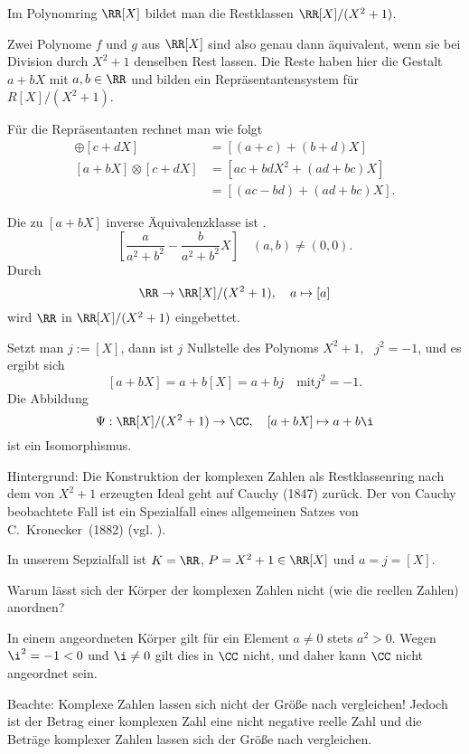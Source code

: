 \begin{antwort}
Im Polynomring $\RR[X]$ bildet man die Restklassen $\RR[X]/(X^2 +1)$.

Zwei Polynome $f$ und $g$ aus $\RR[X]$ sind also genau dann äquivalent, 
wenn sie bei Division durch $X^2+1$ denselben Rest lassen. 
Die Reste haben hier die Gestalt $a+bX$ mit $a,b\in\RR$ und bilden 
ein Repräsentantensystem für $R[X]/(X^2+1)$. 

Für die Repräsentanten rechnet man wie folgt
\begin{align*}
[a+bX] \oplus [c+dX] &= \left[(a+c)+(b+d) X \right] \\
[a+bX] \otimes [c+dX] &= \left[ac+bdX^2 + (ad+bc)X \right] \\
&= \left[ (ac-bd) + (ad+bc) X \right].
\end{align*}

Die zu $[a+bX]$ inverse Äquivalenzklasse ist .
\[
\left[\frac{a}{a^2+b^2}-\frac{b}{a^2+b^2} X\right]\quad
(a,b) \not= (0,0).
\]
Durch 
\[
\RR \to \RR[X] / (X^2+1), \quad 
a \mapsto [a]
\]
wird $\RR$ in $\RR[X]/(X^2+1)$ eingebettet. 

Setzt man $j:= [X]$, dann ist $j$ Nullstelle des Polynoms 
$X^2+1$, \dasheisst\ $j^2=-1$, und es ergibt sich
\[
[a+bX] = a+b[X] = a+bj\quad \text{mit} j^2=-1.
\]
Die Abbildung 
\[
\Psi: \RR[X] / (X^2+1) \to \CC, \quad 
[a+bX] \mapsto a+b\i
\]
ist ein Isomorphismus.

\medskip
\noindent
Hintergrund: Die Konstruktion der komplexen Zahlen als 
Restklassenring nach dem von $X^2+1$ erzeugten Ideal geht auf Cauchy 
(1847) zurück. Der von Cauchy beobachtete Fall ist ein Spezialfall 
eines allgemeinen Satzes von C.~Kronecker~(1882) (vgl. \citep{Karpfinger}).


In unserem Sepzialfall ist $K=\RR$, $P=X^2+1\in \RR[X]$ und 
$a=j=[X]$.
\AntEnd
\end{antwort}


\begin{frage}
Warum lässt sich der Körper der komplexen Zahlen nicht 
(wie die reellen Zahlen) anordnen?
\end{frage}

\begin{antwort}
In einem angeordneten Körper gilt für ein Element $a\not=0$ stets 
$a^2 >0$. Wegen $\i^2 = -1< 0$ und $\i\not=0$ gilt dies in $\CC$ nicht, 
und daher kann $\CC$ nicht angeordnet sein. 

Beachte: Komplexe Zahlen lassen sich nicht der Größe nach vergleichen! 
Jedoch ist der Betrag einer komplexen Zahl eine nicht negative reelle 
Zahl und die Beträge komplexer Zahlen lassen sich der Größe 
nach vergleichen. 
\end{antwort}








